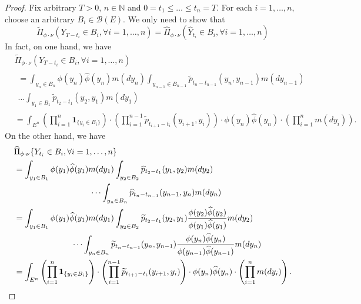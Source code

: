 \documentclass[12pt,a4paper]{amsart}
\numberwithin{equation}{section}
\theoremstyle{plain}
\theoremstyle{definition}
\begin{document}
\begin{proof}
	Fix arbitrary $T>0$, $n \in \mathbb N$ and $0= t_1\leq \dots \leq t_n = T$.
	For each $i=1,\dots, n$, choose an arbitrary $B_i \in \mathscr B(E)$.
	We only need to show that
  \[
    \widetilde \Pi_{\phi \cdot \nu} \left(Y_{T-t_i}\in B_i,\forall i=1,\dots, n \right)
    =\widehat \Pi_{\phi \cdot \nu} \left( \widehat Y_{t_i}\in B_i,\forall i=1,\dots, n \right)
  \]
	In fact, on one hand, we have
  \begin{align}
    &\widetilde \Pi_{\phi \cdot \nu} \left( Y_{T-t_i}\in B_i,\forall i=1,\dots, n \right)
    \\&\begin{multlined} =\int_{y_n\in B_n} \phi(y_n)\widehat\phi(y_n) m(dy_n)\int_{y_{n-1}\in B_{n-1}} \widetilde p_{t_n - t_{n-1}}(y_n,y_{n-1})m(dy_{n-1})
    \\ \dots \int_{y_1\in B_1} \widetilde p_{t_2 - t_1}(y_2,y_1)m(dy_1) \end{multlined}
    \\&= \int_{E^n} \left(\prod_{i=1}^n \mathbf 1_{\{y_i\in B_i\}}\right) \cdot \left( \prod_{i=1}^{n-1} \widetilde p_{t_{i+1}-t_i}(y_{i+1},y_i) \right) \cdot \phi(y_n) \widehat \phi(y_n) \cdot \left( \prod_{i=1}^nm(dy_i) \right).
  \end{align}
	On the other hand, we have
  \begin{align}
    &\widehat \Pi_{\phi\cdot\nu}\{Y_{t_i}\in B_i, \forall i = 1,\dots, n\}
    \\&\begin{multlined} = \int_{y_1\in B_1} \phi(y_1)\widehat \phi(y_1)m(dy_1) \int_{y_2\in B_2} \widehat p_{t_2-t_1}(y_1,y_2)m(dy_2)
    \\ \dots\int_{y_n\in B_n}\widehat p_{t_n-t_{n-1}}(y_{n-1},y_n)m(dy_n) \end{multlined}
    \\&\begin{multlined} = \int_{y_1\in  B_1} \phi(y_1)\widehat \phi(y_1)m(dy_1) \int_{y_2\in B_2} \widetilde p_{t_2-t_1}(y_2,y_1)\frac{\phi(y_2)\widehat \phi(y_2)}{\phi(y_1)\widehat \phi(y_1)}m(dy_2)
    \\ \dots\int_{y_n\in B_n}\widetilde p_{t_n-t_{n-1}}(y_n,y_{n-1})\frac{\phi(y_n)\widehat\phi(y_n)}{\phi(y_{n-1})\widehat\phi(y_{n-1})}m(dy_n) \end{multlined}
    \\&= \int_{E^n} \left( \prod_{i=1}^n \mathbf 1_{\{y_i\in B_i\}}\right) \cdot \left(\prod_{i=1}^{n-1} \widetilde p_{t_{i+1}-t_i}(y_{i+1},y_i) \right) \cdot \phi(y_n) \widehat \phi(y_n) \cdot \left( \prod_{i=1}^n m(dy_i)\right).
    \qedhere
  \end{align}
\end{proof}
\end{document}

